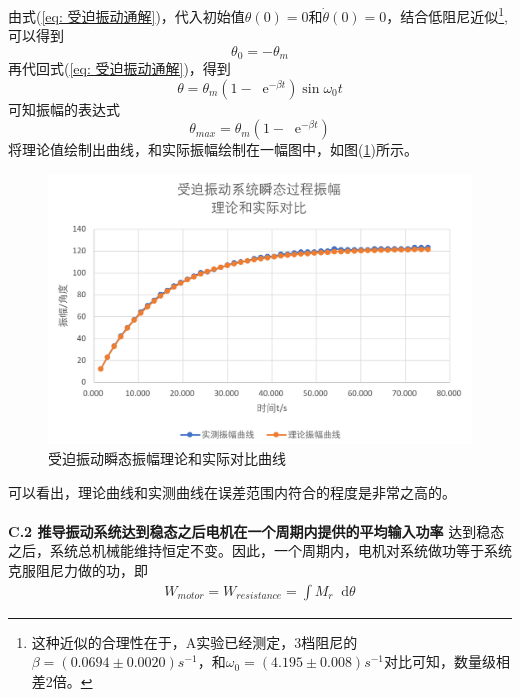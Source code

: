 \documentclass[a4paper,11pt]{article}
\newcommand*{\dif}{\mathop{}\!\mathrm{d}}
\newcommand*{\e}{\mathop{}\!\mathrm{e}}
\begin{document}
        由式(\ref{eq: 受迫振动通解})，代入初始值$\theta(0) = 0$和$\dot{\theta}(0) = 0$，结合低阻尼近似\footnote{这种近似的合理性在于，A实验已经测定，3档阻尼的$\beta = (0.0694 \pm 0.0020)s^{-1} $，和$\omega_0 = (4.195 \pm 0.008)s^{-1}$对比可知，数量级相差2倍。},可以得到
        \begin{equation}
            \theta_0 = -\theta_m
        \end{equation}
        再代回式(\ref{eq: 受迫振动通解})，得到
        \begin{equation}
            \theta = \theta_m(1-\e^{-\beta t})\sin\omega_0t
        \end{equation}
        可知振幅的表达式
        \begin{equation}
            \theta_{max} = \theta_m(1-\e^{-\beta t})
        \end{equation}
        将理论值绘制出曲线，和实际振幅绘制在一幅图中，如图(\ref{fig: 受迫理论和实际})所示。
        
        \begin{figure}[ht]
            \centering
            \includegraphics[scale=0.7]{受迫振动瞬态振幅理论和实际对比曲线.png}
            \caption{受迫振动瞬态振幅理论和实际对比曲线}
            \label{fig: 受迫理论和实际}
        \end{figure}

        可以看出，理论曲线和实测曲线在误差范围内符合的程度是非常之高的。
        ~\\~\\
        \textbf{C.2 推导振动系统达到稳态之后电机在一个周期内提供的平均输入功率}
            达到稳态之后，系统总机械能维持恒定不变。因此，一个周期内，电机对系统做功等于系统克服阻尼力做的功，即
            \begin{eqnarray}
                W_{motor} = W_{resistance} = \int M_r \dif \theta
                
            \end{eqnarray}
\end{document}
